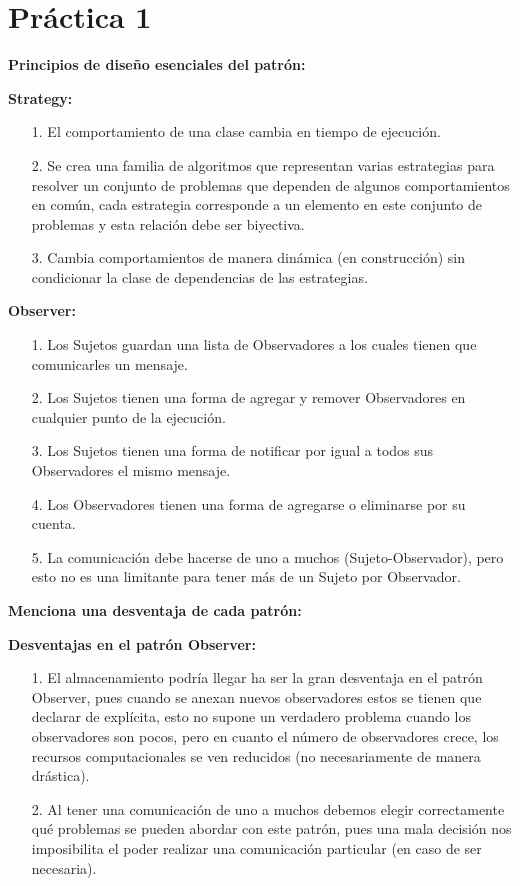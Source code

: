 \documentclass{article}
\begin{document}
	
	\section*{\LARGE{Práctica 1}}

\textbf{Principios de diseño esenciales del patrón:}

\textbf{Strategy:}

\begin{itemize}
\item[1.] El comportamiento de una clase cambia en tiempo de ejecución.
\item[2.] Se crea una familia de algoritmos que representan varias estrategias para resolver un conjunto de problemas que dependen de algunos comportamientos en común, cada estrategia corresponde a un elemento en este conjunto de problemas y esta relación debe ser biyectiva.
\item[3.] Cambia comportamientos de manera dinámica (en construcción) sin condicionar la clase de dependencias de las estrategias.
\end{itemize}

\textbf{Observer:}

\begin{itemize}
\item[1.] Los Sujetos guardan una lista de Observadores a los cuales tienen que comunicarles un mensaje.
\item[2.] Los Sujetos tienen una forma de agregar y remover Observadores en cualquier punto de la ejecución.
\item[3.] Los Sujetos tienen una forma de notificar por igual a todos sus Observadores el mismo mensaje.
\item[4.] Los Observadores tienen una forma de agregarse o eliminarse por su cuenta.
\item[5.] La comunicación debe hacerse de uno a muchos (Sujeto-Observador), pero esto no es una limitante para tener más de un Sujeto por Observador.
\end{itemize}

\textbf{Menciona una desventaja de cada patrón:}

\textbf{Desventajas en el patrón Observer:}
\begin{itemize}
\item[1.] El almacenamiento podría llegar ha ser la gran desventaja en el patrón Observer, pues cuando se anexan nuevos observadores estos se tienen que declarar de explícita, esto no supone un verdadero problema cuando los observadores son pocos, pero en cuanto el número de observadores crece, los recursos computacionales se ven reducidos (no necesariamente de manera drástica).
\item[2.] Al tener una comunicación de uno a muchos debemos elegir correctamente qué problemas se pueden abordar con este patrón, pues una mala decisión nos imposibilita el poder realizar una comunicación particular (en caso de ser necesaria).
\end{itemize}
\end{document}
